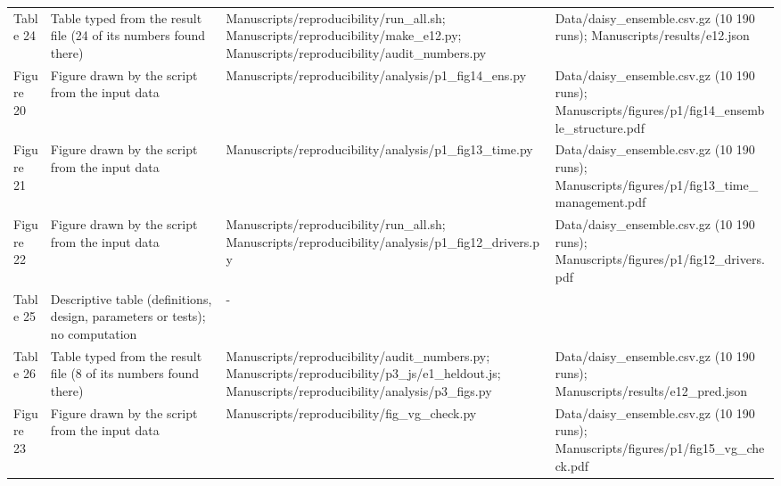 {\begin{longtable}{p{}p{}p{}p{}}
{}Table 24 & Table typed from the result file (24 of its numbers found there) & Manuscripts/\allowbreak{}reproducibility/\allowbreak{}run\_\allowbreak{}all.sh;  Manuscripts/\allowbreak{}reproducibility/\allowbreak{}make\_\allowbreak{}e12.py;  Manuscripts/\allowbreak{}reproducibility/\allowbreak{}audit\_\allowbreak{}numbers.py & Data/\allowbreak{}daisy\_\allowbreak{}ensemble.csv.gz (10 190 runs);  Manuscripts/\allowbreak{}results/\allowbreak{}e12.json\\
{}Figure 20 & Figure drawn by the script from the input data & Manuscripts/\allowbreak{}reproducibility/\allowbreak{}analysis/\allowbreak{}p1\_\allowbreak{}fig14\_\allowbreak{}ens.py & Data/\allowbreak{}daisy\_\allowbreak{}ensemble.csv.gz (10 190 runs);  Manuscripts/\allowbreak{}figures/\allowbreak{}p1/\allowbreak{}fig14\_\allowbreak{}ensemble\_\allowbreak{}structure.pdf\\
{}Figure 21 & Figure drawn by the script from the input data & Manuscripts/\allowbreak{}reproducibility/\allowbreak{}analysis/\allowbreak{}p1\_\allowbreak{}fig13\_\allowbreak{}time.py & Data/\allowbreak{}daisy\_\allowbreak{}ensemble.csv.gz (10 190 runs);  Manuscripts/\allowbreak{}figures/\allowbreak{}p1/\allowbreak{}fig13\_\allowbreak{}time\_\allowbreak{}management.pdf\\
{}Figure 22 & Figure drawn by the script from the input data & Manuscripts/\allowbreak{}reproducibility/\allowbreak{}run\_\allowbreak{}all.sh;  Manuscripts/\allowbreak{}reproducibility/\allowbreak{}analysis/\allowbreak{}p1\_\allowbreak{}fig12\_\allowbreak{}drivers.py & Data/\allowbreak{}daisy\_\allowbreak{}ensemble.csv.gz (10 190 runs);  Manuscripts/\allowbreak{}figures/\allowbreak{}p1/\allowbreak{}fig12\_\allowbreak{}drivers.pdf\\
{}Table 25 & Descriptive table (definitions, design, parameters or tests); no computation & - & \\
{}Table 26 & Table typed from the result file (8 of its numbers found there) & Manuscripts/\allowbreak{}reproducibility/\allowbreak{}audit\_\allowbreak{}numbers.py;  Manuscripts/\allowbreak{}reproducibility/\allowbreak{}p3\_\allowbreak{}js/\allowbreak{}e1\_\allowbreak{}heldout.js;  Manuscripts/\allowbreak{}reproducibility/\allowbreak{}analysis/\allowbreak{}p3\_\allowbreak{}figs.py & Data/\allowbreak{}daisy\_\allowbreak{}ensemble.csv.gz (10 190 runs);  Manuscripts/\allowbreak{}results/\allowbreak{}e12\_\allowbreak{}pred.json\\
{}Figure 23 & Figure drawn by the script from the input data & Manuscripts/\allowbreak{}reproducibility/\allowbreak{}fig\_\allowbreak{}vg\_\allowbreak{}check.py & Data/\allowbreak{}daisy\_\allowbreak{}ensemble.csv.gz (10 190 runs);  Manuscripts/\allowbreak{}figures/\allowbreak{}p1/\allowbreak{}fig15\_\allowbreak{}vg\_\allowbreak{}check.pdf\\

\end{longtable}}
